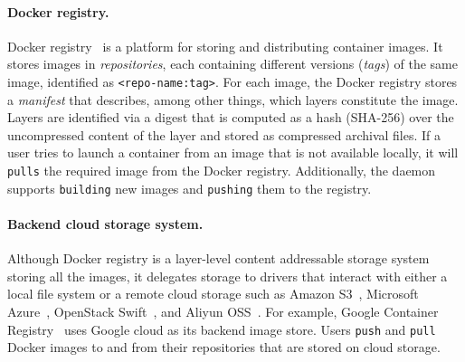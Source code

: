 \paragraph{Docker registry.} 
Docker registry~\cite{docker-hub} is a platform for storing and distributing container images.
It stores images in \emph{repositories}, each containing different versions (\emph{tags}) of the same image, identified as \texttt{<repo-name:tag>}.
For each image, the Docker registry stores a \emph{manifest} that describes, among other things, which layers constitute the image.
Layers are identified via a digest that is computed as a hash (SHA-256) over the uncompressed content of the layer and stored as compressed archival files.
If a user tries to launch a container from an image that is not available locally, it will \texttt{pulls} the required image from the Docker registry.
Additionally, the daemon supports \texttt{building} new images and \texttt{pushing} them to the registry.

\paragraph{Backend cloud storage system.}
Although Docker registry is a layer-level content addressable storage system storing all the images,
it delegates storage to drivers that interact with either a local file system or a remote cloud storage such as Amazon S3~\cite{s3}, Microsoft Azure~\cite{azure}, OpenStack Swift~\cite{swift}, and Aliyun OSS~\cite{aliyun}. 
For example, Google Container Registry~\cite{GoogleContainerRegistry} uses Google cloud 
as its backend image store.
Users \texttt{push} and \texttt{pull} Docker images to and from their repositories that are stored on cloud storage. 

